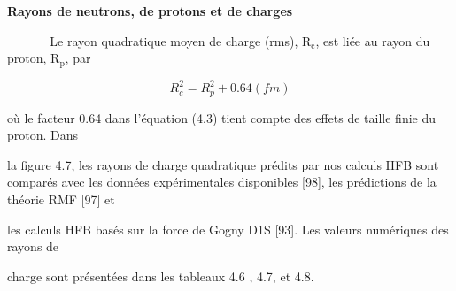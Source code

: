 \documentclass[a4paper]{article}
\providecommand\textsubscript[1]{\ensuremath{{}_{\text{#1}}}}
\begin{document}
\bigskip


\bigskip


\bigskip


\bigskip


\bigskip


\bigskip


\bigskip


\bigskip


\bigskip


\bigskip


\bigskip


\bigskip


\bigskip


\bigskip


\bigskip


\bigskip


\bigskip


\bigskip


\bigskip


\bigskip

\textbf{Rayons de neutrons, de protons et de charges}


\bigskip

\textbf{\ \ \ \ \ \ }Le rayon quadratique moyen de charge (rms), R\textit{\textsubscript{c}}, est liée au rayon du
proton, R\textit{\textsubscript{p}}, par


\bigskip

\begin{equation*}
R_c^2=R_p^2+0.64(\mathit{fm})
\end{equation*}

\bigskip

où le facteur 0.64 dans l’équation (4.3) tient compte des effets de taille finie du proton. Dans

la figure 4.7, les rayons de charge quadratique prédits par nos calculs HFB sont comparés avec les données
expérimentales disponibles [98], les prédictions de la théorie RMF [97] et

les calculs HFB basés sur la force de Gogny D1S [93]. Les valeurs numériques des rayons de

charge sont présentées dans les tableaux 4.6 , 4.7, et 4.8.


\bigskip
\end{document}
